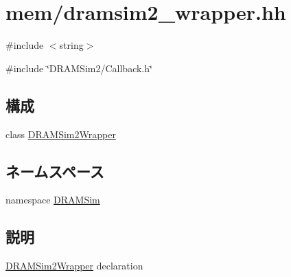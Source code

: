 \hypertarget{dramsim2__wrapper_8hh}{
\section{mem/dramsim2\_\-wrapper.hh}
\label{dramsim2__wrapper_8hh}
}
{\ttfamily \#include $<$string$>$}\par
{\ttfamily \#include \char`\"{}DRAMSim2/Callback.h\char`\"{}}\par
\subsection*{構成}
\begin{DoxyCompactItemize}
\item 
class \hyperlink{classDRAMSim2Wrapper}{DRAMSim2Wrapper}
\end{DoxyCompactItemize}
\subsection*{ネームスペース}
\begin{DoxyCompactItemize}
\item 
namespace \hyperlink{namespaceDRAMSim}{DRAMSim}
\end{DoxyCompactItemize}


\subsection{説明}
\hyperlink{classDRAMSim2Wrapper}{DRAMSim2Wrapper} declaration 